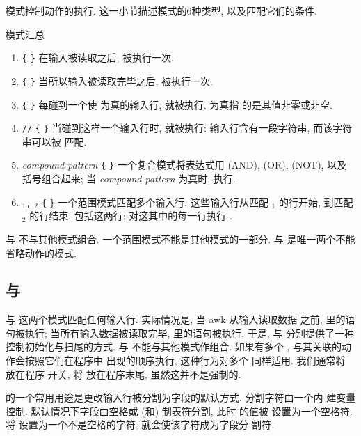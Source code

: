 模式控制动作的执行. 这一小节描述模式的6种类型, 以及匹配它们的条件.
\begin{summary}{模式汇总}
    \begin{enumerate}
        \item \BEGIN \verb'{' \stmt \verb'}'
            在输入被读取之后, \stmt 被执行一次.
        \item \END \verb'{' \stmt \verb'}'
            当所以输入被读取完毕之后, \stmt 被执行一次.
        \item \expr \verb'{' \stmt \verb'}'
            每碰到一个使 \expr 为真的输入行, \stmt 就被执行. \expr 为真指
            的是其值非零或非空.
        \item \verb'/'\regexpr\verb'/' \verb'{'
            \stmt \verb'}'
            当碰到这样一个输入行时, \stmt 就被执行: 输入行含有一段字符串,
            而该字符串可以被 \regexpr 匹配.
        \item \textit{compound pattern} \verb'{' \stmt \verb'}'
            一个复合模式将表达式用 \AND (AND), \OR (OR), \NOT (NOT), 以及
            括号组合起来; 当 \textit{compound pattern} 为真时, \stmt 执行.
        \item \pat$_1$\verb',' \pat$_2$ \verb'{' \stmt \verb'}'
            一个范围模式匹配多个输入行, 这些输入行从匹配 \pat$_1$ 的行开始,
            到匹配 \pat$_2$ 的行结束, 包括这两行; 对这其中的每一行执行
            \stmt.
    \end{enumerate}
    \BEGIN 与 \END 不与其他模式组合. 一个范围模式不能是其他模式的一部分.
    \BEGIN 与 \END 是唯一两个不能省略动作的模式.
\end{summary}

\subsection{\BEGIN 与 \END}
\label{subsec:begin_and_end}

\BEGIN 与 \END 这两个模式匹配任何输入行. 实际情况是, 当 awk 从输入读取数据
之前, \BEGIN 里的语句被执行; 当所有输入数据被读取完毕, \END 里的语句被执行.
于是, \BEGIN 与 \END 分别提供了一种控制初始化与扫尾的方式. \BEGIN 与 \END
不能与其他模式作组合. 如果有多个 \BEGIN, 与其关联的动作会按照它们在程序中
出现的顺序执行, 这种行为对多个 \END 同样适用. 我们通常将 \BEGIN 放在程序
开关, 将 \END 放在程序末尾, 虽然这并不是强制的.

\BEGIN 的一个常用用途是更改输入行被分割为字段的默认方式. 分割字符由一个内
建变量 \fs 控制. 默认情况下字段由空格或 (和) 制表符分割, 此时 \fs 的值被
设置为一个空格符. 将 \fs 设置为一个不是空格的字符, 就会使该字符成为字段分
割符.

